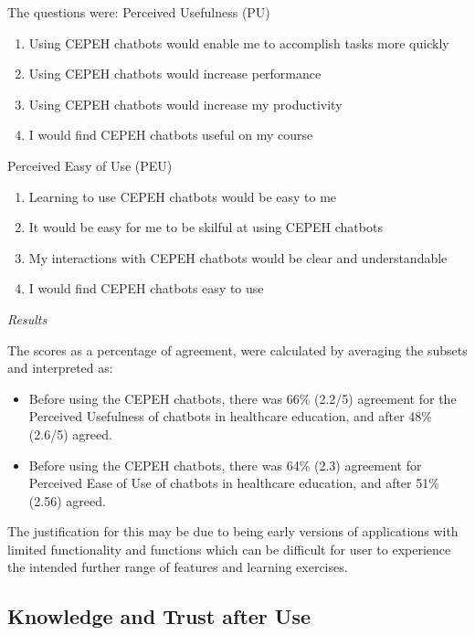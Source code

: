 \documentclass[a4paper, nobind]{templates/ociamthesis}
\providecommand{\tightlist}{%
  \setlength{\itemsep}{0pt}\setlength{\parskip}{0pt}}
\begin{document}
The questions were: Perceived Usefulness (PU)

\begin{enumerate}
\def\labelenumi{\arabic{enumi}.}
\tightlist
\item
  Using CEPEH chatbots would enable me to accomplish tasks more
  quickly
\item
  Using CEPEH chatbots would increase performance
\item
  Using CEPEH chatbots would increase my productivity
\item
  I would find CEPEH chatbots useful on my course
\end{enumerate}

Perceived Easy of Use (PEU)

\begin{enumerate}
\def\labelenumi{\arabic{enumi}.}
\setcounter{enumi}{4}
\tightlist
\item
  Learning to use CEPEH chatbots would be easy to me
\item
  It would be easy for me to be skilful at using CEPEH chatbots
\item
  My interactions with CEPEH chatbots would be clear and
  understandable
\item
  I would find CEPEH chatbots easy to use
\end{enumerate}

\emph{Results}

The scores as a percentage of agreement, were calculated by averaging the subsets and interpreted as:

\begin{itemize}
\item
  Before using the CEPEH chatbots, there was 66\% (2.2/5) agreement for
  the Perceived Usefulness of chatbots in healthcare education, and
  after 48\% (2.6/5) agreed.
\item
  Before using the CEPEH chatbots, there was 64\% (2.3) agreement for
  Perceived Ease of Use of chatbots in healthcare education, and after
  51\% (2.56) agreed.
\end{itemize}

The justification for this may be due to being early versions of applications with limited functionality and functions which can be difficult for user to experience the intended further range of features and learning exercises.

\hypertarget{knowledge-and-trust-after-use}{%
\subsection{Knowledge and Trust after Use}\label{knowledge-and-trust-after-use}}
\end{document}
